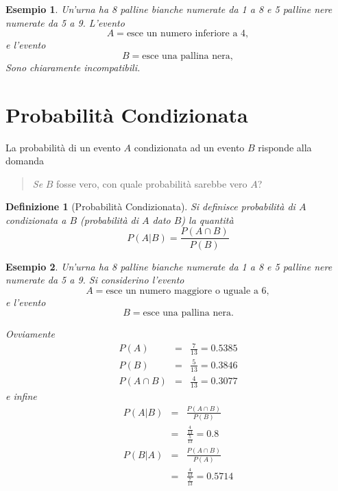\documentclass[
  11pt,
]{book}
\theoremstyle{mytheoremstyle}
\theoremstyle{mydefstyle}
\newtheorem{definition}{Definizione}[section]
\newtheorem{example}{{Esempio}}[section]
\begin{document}
\begin{example}
Un'urna ha 8 palline bianche numerate da 1 a 8 e 5 palline nere numerate
da 5 a 9. L'evento \[A=\text{esce un numero inferiore a 4},\] e l'evento
\[B=\text{esce una pallina nera},\] Sono chiaramente incompatibili.
\end{example}

\section{Probabilità Condizionata}\label{probabilituxe0-condizionata}

La probabilità di un evento \(A\) condizionata ad un evento \(B\) risponde
alla domanda

\begin{quote}
\emph{Se} \(B\) fosse vero, con quale probabilità sarebbe vero \(A\)?
\end{quote}

\begin{info}

\begin{definition}[Probabilità Condizionata]
\protect\hypertarget{def:pcond}{}\label{def:pcond}Si definisce probabilità di \(A\) condizionata a \(B\) (probabilità di \(A\)
dato \(B\)) la quantità
\[
P(A|B)=\frac{P(A\cap B)}{P(B)}
\]
\end{definition}

\end{info}

\begin{example}
Un'urna ha 8 palline bianche numerate da 1 a 8 e 5 palline nere numerate
da 5 a 9. Si considerino l'evento
\[A=\text{esce un numero maggiore o uguale a 6},\] e l'evento
\[B=\text{esce una pallina nera}.\]

Ovviamente \begin{eqnarray*}
   P(A)&=&  \frac{7}{13}=0.5385\\
   P(B)&=&  \frac{5}{13}=0.3846\\
   P(A\cap B)&=&  \frac{4}{13}=0.3077
\end{eqnarray*} e infine \begin{eqnarray*}
   P(A|B)&=&  \frac{P(A\cap B)}{P(B)}\\
   &=&  \frac{\frac{4}{13}}{\frac{5}{13}}=0.8\\
   P(B|A)&=&  \frac{P(A\cap B)}{P(A)}\\
   &=&  \frac{\frac{4}{13}}{\frac{7}{13}}=0.5714
\end{eqnarray*}
\end{example}
\end{document}
